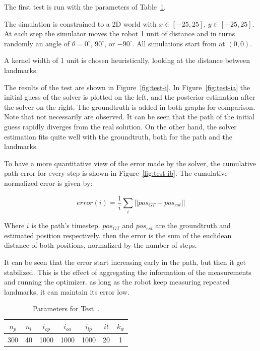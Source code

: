 \begin{test}

The first test is run with the parameters of Table~\ref{tab:test-i}. 

The simulation is constrained to a 2D world with $x\in[-25,25]$, $y\in[-25,25]$. At each step the simulator moves the robot 1 unit of distance and in turns randomly an angle of $\theta=0^\circ$, $90^\circ$, or $-90^\circ$. All simulations start from at $(0,0)$.

A kernel width of 1 unit is chosen heuristically, looking at the distance between landmarks. 

The results of the test are shown in Figure~\ref{fig:test-i}. In Figure~\ref{fig:test-ia} the initial guess of the solver is plotted on the left, and the posterior estimation after the solver on the right. The groundtruth is added in both graphs for comparison. Note that not necessarily are observed.  It can be seen that the path of the initial guess rapidly diverges from the real solution. On the other hand, the solver estimation fits quite well with the groundtruth, both for the path and the landmarks.

To have a more quantitative view of the error made by the solver, the cumulative path error for every step is shown in Figure~\ref{fig:test-ib}.  The cumulative normalized error is given by:

\begin{equation}
error (i) = \frac{1}{i} \sum_{i} ||pos_{GT}-pos_{est}||
\end{equation} 

Where $i$ is the path's timestep. $pos_{GT}$ and $pos_{est}$ are the groundtruth and estimated position respectively. then the error is the sum of the euclidean distance of both positions, normalized by the number of steps. 

It can be seen that the error start increasing early in the path, but then it get stabilized. This is the effect of aggregating the information of the measurements and running the optimizer. as long as the robot keep measuring repeated landmarks, it can maintain its error low. 

\begin{table}[htbp!]
\centering
\begin{tabular}{|c|c|c|c|c|c|c|}
    \hline
    $n_p$ & $n_l$ & $i_{op}$ & $i_{oa}$ & $i_{lp}$ & $it$ & $k_w$\\
    \hline \hline
    300 & 40 & 1000 & 1000 & 1000 & 20 & 1\\
    \hline 
\end{tabular}
\caption{Parameters for Test~.}
\label{tab:test-i}
\end{table}


\end{test}
